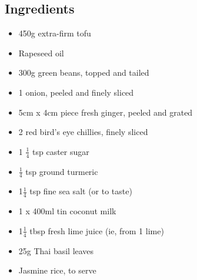 \documentclass{book}
\begin{document}
\subsection*{Ingredients}
\begin{itemize}
\item 450g extra-firm tofu
\item Rapeseed oil
\item 300g green beans, topped and tailed 
\item 1 onion, peeled and finely sliced
\item 5cm x 4cm piece fresh ginger, peeled and grated 
\item 2 red bird’s eye chillies, finely sliced
\item 1 $\frac{1}{4}$ tsp caster sugar
\item $\frac{1}{4}$ tsp ground turmeric 
\item 1$\frac{1}{4}$ tsp fine sea salt (or to taste) 
\item 1 x 400ml tin coconut milk
\item 1$\frac{1}{4}$ tbsp fresh lime juice (ie, from 1 lime) 
\item 25g Thai basil leaves
\item Jasmine rice, to serve
\end{itemize}
\end{document}
